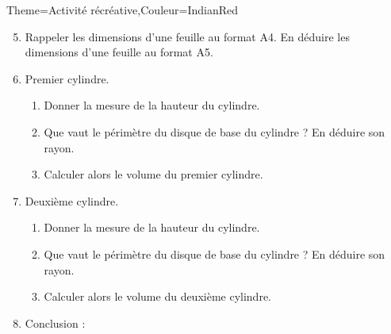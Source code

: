\begin{Maquette}[Cours]{Theme={Activité récréative},Couleur={IndianRed}}
         \begin{enumerate}
         \setcounter{enumi}{4}
            \item Rappeler les dimensions d'une feuille au format A4. En déduire les dimensions d'une feuille au format A5. \par \smallskip
               \pointilles
            \item Premier cylindre.
            \begin{enumerate}
               \item Donner la mesure de la hauteur du cylindre. \pointilles
               \item Que vaut le périmètre du disque de base du cylindre ? En déduire son rayon. \par \smallskip
               \pointilles
               \item Calculer alors  le volume du premier cylindre. \par \smallskip
               \pointilles
            \end{enumerate}
            \item Deuxième cylindre.
            \begin{enumerate}
               \item Donner la mesure de la hauteur du cylindre. \pointilles
               \item Que vaut le périmètre du disque de base du cylindre ? En déduire son rayon. \par \smallskip
               \pointilles
               \item Calculer alors  le volume du deuxième cylindre. \par \smallskip
               \pointilles
            \end{enumerate}
            \item Conclusion : \pointilles \par \medskip
               \pointilles
         \end{enumerate}

\end{Maquette}